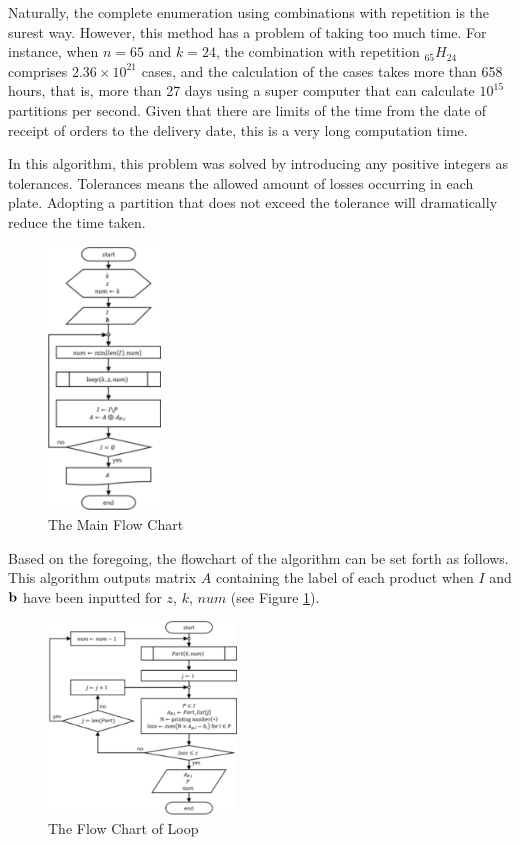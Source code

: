 Naturally, the complete enumeration using combinations with repetition is the surest way. 
However, this method has a problem of taking too much time. 
For instance, when $n=65$ and $k = 24$, the combination with repetition $_{65}H_{24}$ comprises $2.36 \times 10^{21}$ cases, 
and the calculation of the cases takes more than 658 hours, that is, more than 27 days using a super computer that can calculate $10^{15}$ partitions per second. 
Given that there are limits of the time from the date of receipt of orders to the delivery date, this is a very long computation time.

In this algorithm, this problem was solved by introducing any positive integers as tolerances. 
Tolerances means the allowed amount of losses occurring in each plate. 
Adopting a partition that does not exceed the tolerance will dramatically reduce the time taken.

\begin{figure}[h!]
	\centering
	\includegraphics[width=3cm]{MainFChart.pdf}
	\caption{The Main Flow Chart}
	\label{fig:MFChart}       %
\end{figure}

Based on the foregoing, the flowchart of the algorithm can be set forth as follows. 
This algorithm outputs matrix $A$ containing the label of each product when $I$ and ${\bf b}$ have been inputted for $z$, $k$, $num$ (see Figure \ref{fig:MFChart}). 

\begin{figure}[h!]
	\centering
	\includegraphics[width=5cm]{SubFChart.pdf}
	\caption{The Flow Chart of Loop}
	\label{fig:SFChart}       %
\end{figure}

